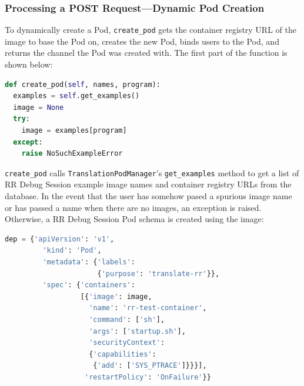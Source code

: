 \documentclass[12pt]{article}
\begin{document}


\subsubsection{Processing a POST Request---Dynamic Pod Creation}

To dynamically create a Pod, \lstinline{create_pod} gets the container
registry URL of the image to base the Pod on, creates the new Pod,
binds users to the Pod, and returns the channel the Pod was created
with.  The first part of the function is shown below:

\begin{lstlisting}[language=Python,basicstyle=\linespread{0.5}\ttfamily,caption={Pod Creation 1},captionpos=b]
def create_pod(self, names, program):
  examples = self.get_examples()
  image = None
  try:
    image = examples[program]
  except:
    raise NoSuchExampleError
\end{lstlisting}

\lstinline{create_pod} calls \lstinline{TranslationPodManager}'s
\lstinline{get_examples} method to get a list of RR Debug Session
example image names and container registry URLs from the database.  In
the event that the user has somehow pased a spurious image name or has
passed a name when there are no images, an exception is raised.
Otherwise, a RR Debug Session Pod schema is created using the image:


\begin{lstlisting}[language=Python,basicstyle=\linespread{0.5}\ttfamily,caption={Pod Creation 2},captionpos=b]
  dep = {'apiVersion': 'v1',
         'kind': 'Pod',
         'metadata': {'labels':
                      {'purpose': 'translate-rr'}},
         'spec': {'containers':
                  [{'image': image,
                    'name': 'rr-test-container',
                    'command': ['sh'],
                    'args': ['startup.sh'],
                    'securityContext':
                    {'capabilities':
                     {'add': ['SYS_PTRACE']}}}],
                   'restartPolicy': 'OnFailure'}}
\end{lstlisting}
\end{document}

